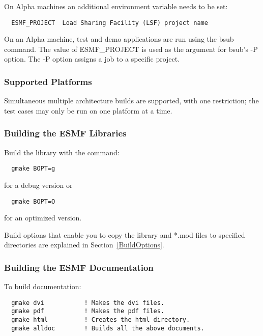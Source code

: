 On Alpha machines an additional environment variable needs
to be set:

\begin{verbatim}
  ESMF_PROJECT  Load Sharing Facility (LSF) project name 
\end{verbatim}

On an Alpha machine, test and demo applications are run using 
the bsub command.  The value of ESMF\_PROJECT is used as the 
argument for bsub's -P option. The -P option assigns a job to 
a specific project.  


\subsubsection{Supported Platforms}


Simultaneous multiple architecture builds are supported, with
one restriction; the test cases may only be run on one platform at a time. 

\subsubsection{Building the ESMF Libraries}
\label{BuildESMF}

Build the library with the command:
\begin{verbatim}
  gmake BOPT=g  
\end{verbatim}
  for a debug version or
\begin{verbatim}
  gmake BOPT=O  
\end{verbatim}
  for an optimized version.



Build options that enable you to copy the library and *.mod files to
specified directories are explained in Section~\ref{BuildOptions}. 

\subsubsection{Building the ESMF Documentation}
\label{BuildDocumentation}

\noindent To build documentation:
\begin{verbatim}
  gmake dvi           ! Makes the dvi files.
  gmake pdf           ! Makes the pdf files.
  gmake html          ! Creates the html directory.
  gmake alldoc        ! Builds all the above documents.
\end{verbatim}

